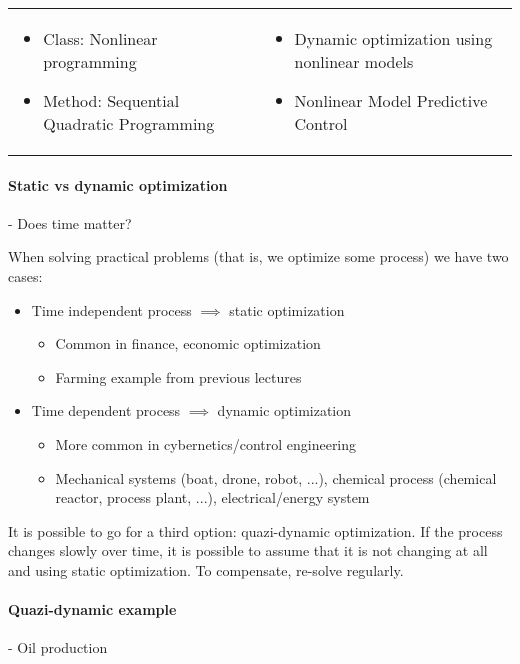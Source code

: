 \documentclass{article}
\begin{document}
\begin{center}
\begin{tabular}{p{6cm}p{10cm}}
    \hline
    \begin{itemize}
      \item Class: Nonlinear programming
      \item Method: Sequential Quadratic Programming
    \end{itemize}
                                            &
    \begin{itemize}
      \item Dynamic optimization using nonlinear models
      \item Nonlinear Model Predictive Control
    \end{itemize}
  \end{tabular}
\end{center}

\paragraph{Static vs dynamic optimization}- Does time matter?

\medskip When solving practical problems (that is, we optimize some process) we have two cases:
\begin{itemize}
  \item Time independent process $\implies$ static optimization
        \begin{itemize}
          \item Common in finance, economic optimization
          \item Farming example from previous lectures
        \end{itemize}
  \item Time dependent process $\implies$ dynamic optimization
        \begin{itemize}
          \item More common in cybernetics/control engineering
          \item Mechanical systems (boat, drone, robot, ...), chemical process (chemical reactor, process plant, ...), electrical/energy system
        \end{itemize}
\end{itemize}

It is possible to go for a third option: quazi-dynamic optimization. If the process changes slowly over time, it is possible to assume that it
is not changing at all and using static optimization. To compensate, re-solve regularly.

\paragraph{Quazi-dynamic example}- Oil production
\end{document}

